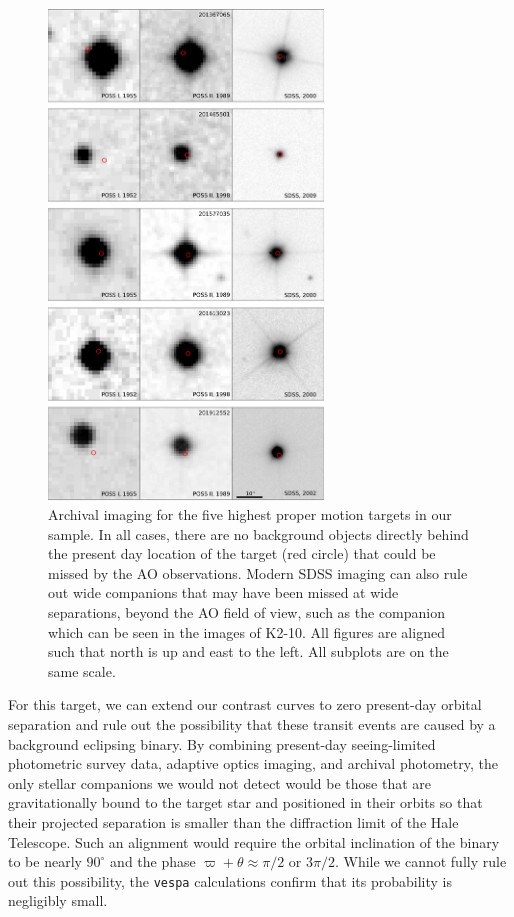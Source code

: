 \begin{figure}[htbp]
\centerline{\includegraphics[width=0.65\textwidth]{chapter7/f5.pdf}}
\caption[Archival imaging for the five highest proper motion targets in our sample]{Archival imaging for the five highest proper motion targets in our sample.
In all cases, there are no background
objects directly behind the present day location of the target (red circle) that could be missed
by the AO observations. Modern SDSS imaging can also rule out wide companions
that may have been missed at wide separations, beyond the AO field of view, such as the
companion which can be seen in the images of K2-10.
All figures are aligned such that north is up and east to the left.
All subplots are on the same scale.}
\label{fig:archival}
\end{figure}


For this target, we can extend our contrast curves to zero
present-day orbital separation and rule out the possibility that
these transit events are caused by a background eclipsing binary.
By combining present-day seeing-limited photometric survey data,
adaptive optics imaging, and archival photometry, the only stellar companions
we would not detect would be those that are gravitationally bound to the target
star and positioned in their orbits so that their projected separation is
smaller than the diffraction limit of the Hale Telescope.
Such an alignment would require the orbital inclination of the binary to be
nearly $90^\circ$ and the phase $\varpi + \theta \approx \pi/2$ or $3\pi/2$.
While we cannot fully rule out this possibility, the \texttt{vespa}
calculations confirm that its probability is negligibly small.




